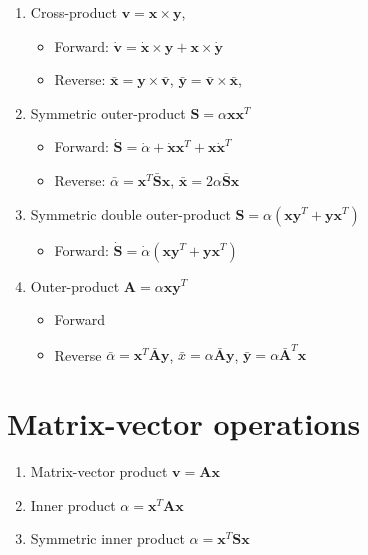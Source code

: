 \documentclass{article}
\begin{document}
\begin{enumerate}
\item Cross-product $\mathbf{v} = \mathbf{x} \times \mathbf{y}$,
\begin{itemize}
\item Forward: $\dot{\mathbf{v}} = \dot{\mathbf{x}} \times \mathbf{y} + \mathbf{x} \times \dot{\mathbf{y}}$
\item Reverse: $\bar{\mathbf{x}} = \mathbf{y} \times \bar{\mathbf{v}}$, $\bar{\mathbf{y}} = \bar{\mathbf{v}} \times \bar{\mathbf{x}}$, 
\end{itemize}

\item Symmetric outer-product $\mathbf{S} = \alpha \mathbf{x}\mathbf{x}^{T}$
\begin{itemize}
\item Forward: $\dot{\mathbf{S}} = \dot{\alpha} + \dot{\mathbf{x}} \mathbf{x}^{T} + \mathbf{x} \dot{\mathbf{x}}^{T}$
\item Reverse: $\bar{\alpha} = \mathbf{x}^{T} \bar{\mathbf{S}} \mathbf{x}$, $\bar{\mathbf{x}} = 2 \alpha \bar{\mathbf{S}} \mathbf{x}$
\end{itemize}

\item Symmetric double outer-product $\mathbf{S} = \alpha (\mathbf{x} \mathbf{y}^{T} + \mathbf{y} \mathbf{x}^{T})$
\begin{itemize}
\item Forward: $\dot{\mathbf{S}} = \dot{\alpha}  (\mathbf{x} \mathbf{y}^{T} + \mathbf{y} \mathbf{x}^{T})$
\end{itemize}

\item Outer-product $\mathbf{A} = \alpha \mathbf{x}\mathbf{y}^{T}$
\begin{itemize}
\item Forward
\item Reverse $\bar{\alpha} = \mathbf{x}^{T} \bar{\mathbf{A}} \mathbf{y}$, $\bar{x} = \alpha \bar{\mathbf{A}} \mathbf{y}$, $\bar{\mathbf{y}} = \alpha \bar{\mathbf{A}}^{T} \mathbf{x}$
\end{itemize}

\end{enumerate}

\section{Matrix-vector operations}

\begin{enumerate}
\item Matrix-vector product $\mathbf{v} = \mathbf{A} \mathbf{x}$
\item Inner product $\alpha = \mathbf{x}^{T} \mathbf{A} \mathbf{x}$
\item Symmetric inner product $\alpha = \mathbf{x}^{T} \mathbf{S} \mathbf{x}$
\end{enumerate}
\end{document}
